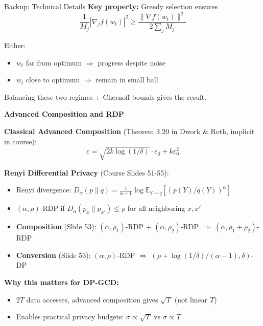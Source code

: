 \documentclass[10pt]{beamer}
\begin{document}
\begin{frame}[allowframebreaks]{Backup: Technical Details}
\vspace{0.5em}
\textbf{Key property:} Greedy selection ensures
\[
\frac{1}{M_j} |\nabla_j f(w_t)|^2 \geq \frac{\|\nabla f(w_t)\|^2}{2 \sum_j M_j}
\]

\vspace{0.5em}
Either:
\begin{itemize}
\item $w_t$ far from optimum $\Rightarrow$ progress despite noise
\item $w_t$ close to optimum $\Rightarrow$ remain in small ball
\end{itemize}

Balancing these two regimes + Chernoff bounds gives the result.

\framebreak

\textbf{Advanced Composition and RDP}

\vspace{0.5em}
\textbf{Classical Advanced Composition} (Theorem 3.20 in Dwork \& Roth, implicit in course):
\[
\varepsilon = \sqrt{2k\log(1/\delta)} \cdot \varepsilon_0 + k\varepsilon_0^2
\]

\vspace{0.5em}
\textbf{Renyi Differential Privacy} (Course Slides 51-55):
\begin{itemize}
\item Renyi divergence: $D_\alpha(p\|q) = \frac{1}{\alpha-1}\log \mathbb{E}_{Y \sim q}[(p(Y)/q(Y))^\alpha]$
\item $(\alpha, \rho)$-RDP if $D_\alpha(p_{x}\|p_{x'}) \leq \rho$ for all neighboring $x, x'$
\item \textbf{Composition} (Slide 53): $(\alpha, \rho_1)$-RDP + $(\alpha, \rho_2)$-RDP $\Rightarrow$ $(\alpha, \rho_1 + \rho_2)$-RDP
\item \textbf{Conversion} (Slide 53): $(\alpha, \rho)$-RDP $\Rightarrow$ $(\rho + \log(1/\delta)/(\alpha-1), \delta)$-DP
\end{itemize}

\vspace{0.5em}
\textbf{Why this matters for DP-GCD:}
\begin{itemize}
\item $2T$ data accesses, advanced composition gives $\sqrt{T}$ (not linear $T$)
\item Enables practical privacy budgets: $\sigma \propto \sqrt{T}$ vs $\sigma \propto T$
\end{itemize}
\end{frame}
\end{document}
